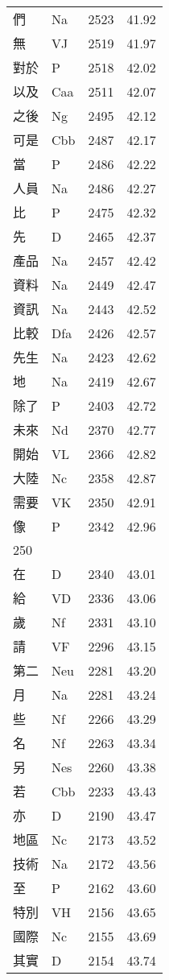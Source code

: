\documentclass[twocolumn]{book}
\begin{document}
\begin{supertabular}{llrr}
們 & Na & 2523 &  41.92\\
無 & VJ & 2519 &  41.97\\
對於 & P & 2518 &  42.02\\
以及 & Caa & 2511 &  42.07\\
之後 & Ng & 2495 &  42.12\\
可是 & Cbb & 2487 &  42.17\\
當 & P & 2486 &  42.22\\
人員 & Na & 2486 &  42.27\\
比 & P & 2475 &  42.32\\
先 & D & 2465 &  42.37\\
產品 & Na & 2457 &  42.42\\
資料 & Na & 2449 &  42.47\\
資訊 & Na & 2443 &  42.52\\
比較 & Dfa & 2426 &  42.57\\
先生 & Na & 2423 &  42.62\\
地 & Na & 2419 &  42.67\\
除了 & P & 2403 &  42.72\\
未來 & Nd & 2370 &  42.77\\
開始 & VL & 2366 &  42.82\\
大陸 & Nc & 2358 &  42.87\\
需要 & VK & 2350 &  42.91\\
像 & P & 2342 &  42.96\\
250\\
在 & D & 2340 &  43.01\\
給 & VD & 2336 &  43.06\\
歲 & Nf & 2331 &  43.10\\
請 & VF & 2296 &  43.15\\
第二 & Neu & 2281 &  43.20\\
月 & Na & 2281 &  43.24\\
些 & Nf & 2266 &  43.29\\
名 & Nf & 2263 &  43.34\\
另 & Nes & 2260 &  43.38\\
若 & Cbb & 2233 &  43.43\\
亦 & D & 2190 &  43.47\\
地區 & Nc & 2173 &  43.52\\
技術 & Na & 2172 &  43.56\\
至 & P & 2162 &  43.60\\
特別 & VH & 2156 &  43.65\\
國際 & Nc & 2155 &  43.69\\
其實 & D & 2154 &  43.74\\

\end{supertabular}
\end{document}
